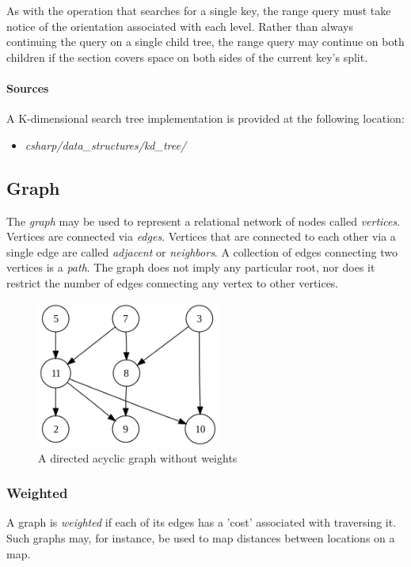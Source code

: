 \documentclass{article}
\begin{document}
{As with the operation that searches for a single key, the range query must take notice of the orientation
associated with each level. Rather than always continuing the query on a single child tree,
the range query may continue on both children if the section covers space on both sides of the current key's split.

\begin{samepage}
  \paragraph{Sources}
  A K-dimensional search tree implementation is provided at the following location:
  \begin{itemize}
  \item{{\em csharp/data\_structures/kd\_tree/}}
  \end{itemize}
\end{samepage}




\subsection{Graph}
The {\em graph} may be used to represent a relational network of nodes called {\em vertices}.
Vertices are connected via {\em edges}. Vertices that are connected to each other via a single edge are called
{\em adjacent} or {\em neighbors}. A collection of edges connecting two vertices is a {\em path}. The graph does
not imply any particular root, nor does it restrict the number of edges connecting any vertex to other vertices.

\begin{figure}[H]
  \centering
  \includegraphics[width=6cm]{graph_0}
  \caption{A directed acyclic graph without weights}
\end{figure}

\subsubsection{Weighted}
A graph is {\em weighted} if each of its edges has a 'cost' associated with traversing it.
Such graphs may, for instance, be used to map distances between locations on a map.

}
\end{document}
